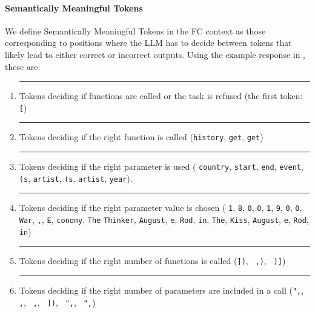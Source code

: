 \paragraph{Semantically Meaningful Tokens}
We define Semantically Meaningful Tokens in the FC context as those corresponding to positions where the LLM has to decide between tokens that likely lead to either correct or incorrect outputs. Using the example response in , these are:
\begin{enumerate}[leftmargin=*, topsep=0pt, itemsep=2pt, partopsep=0pt, parsep=0pt]
    \item \textcolor{pink1}{\rule{1.2ex}{1.2ex}} Tokens deciding if functions are called or the task is refused (the first token: \texttt{[})
    \item \textcolor{yellow2}{\rule{1.2ex}{1.2ex}} Tokens deciding if the right function is called (\texttt{history}, \texttt{get}, \texttt{get})
    \item \textcolor{green3}{\rule{1.2ex}{1.2ex}} Tokens deciding if the right parameter is used 
    (
    \texttt{country}, 
    \texttt{start}, 
    \texttt{end}, 
    \texttt{event}, 
    \texttt{(s}, 
    \texttt{artist}, 
    \texttt{(s}, 
    \texttt{artist}, 
    \texttt{year}). 
    \item \textcolor{blue4}{\rule{1.2ex}{1.2ex}} Tokens deciding if the right parameter value is chosen (
    \texttt{1}, \texttt{8}, \texttt{0}, \texttt{0}, \texttt{1}, \texttt{9}, \texttt{0}, \texttt{0}, \texttt{War}, \texttt{,}, \texttt{E}, \texttt{conomy}, \texttt{The} \texttt{Thinker}, \texttt{August}, \texttt{e}, \texttt{Rod}, \texttt{in}, \texttt{The}, \texttt{Kiss}, \texttt{August}, \texttt{e}, \texttt{Rod}, \texttt{in})
    \item \textcolor{cyan5}{\rule{1.2ex}{1.2ex}} Tokens deciding if the right number of functions is called (\texttt{])}, \texttt{ ,)}, \texttt{ )]})
    \item \textcolor{purple6}{\rule{1.2ex}{1.2ex}} Tokens deciding if the right number of parameters are included in a call (\texttt{",}, \texttt{ ,}, \texttt{ ,}, \texttt{ ])}, \texttt{ ",}, \texttt{ ",})
\end{enumerate}


